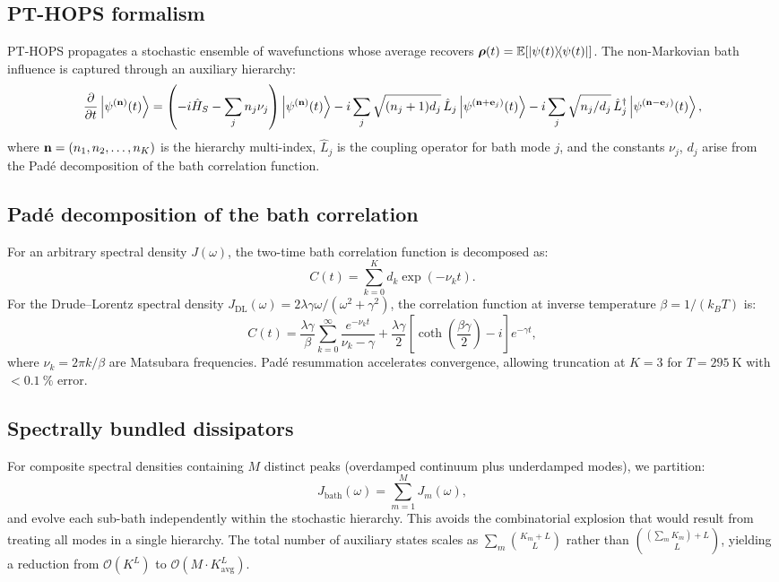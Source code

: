 \documentclass[journal=jctc,manuscript=article]{achemso}
\begin{document}
\subsection{PT-HOPS formalism}
PT-HOPS propagates a stochastic ensemble of wavefunctions whose average recovers $\vb*{\rho}(t) = \mathbb{E}[\dyad{\psi(t)}]$. The non-Markovian bath influence is captured through an auxiliary hierarchy:\cite{Suess2014,Citty2024a}
\begin{equation}
\pdv{t}\ket{\psi^{(\vb{n})}(t)} = \left(-i\hat{H}_S - \sum_{j} n_j \nu_j\right)\ket{\psi^{(\vb{n})}(t)}
- i\sum_{j} \sqrt{(n_j+1)d_j}\, \hat{L}_j \ket{\psi^{(\vb{n}+\vb{e}_j)}(t)}
- i\sum_{j} \sqrt{n_j/d_j}\, \hat{L}_j^\dagger \ket{\psi^{(\vb{n}-\vb{e}_j)}(t)},
\label{eq:hops}
\end{equation}
where $\vb{n} = (n_1, n_2, \ldots, n_K)$ is the hierarchy multi-index, $\hat{L}_j$ is the coupling operator for bath mode $j$, and the constants $\nu_j$, $d_j$ arise from the Padé decomposition of the bath correlation function.\cite{Duan2017}

\subsection{Padé decomposition of the bath correlation}
For an arbitrary spectral density $J(\omega)$, the two-time bath correlation function is decomposed as:
\begin{equation}
C(t) = \sum_{k=0}^{K} d_k \exp(-\nu_k t).
\label{eq:bath_correlation}
\end{equation}
For the Drude--Lorentz spectral density $J_{\mathrm{DL}}(\omega) = 2\lambda\gamma\omega/(\omega^2 + \gamma^2)$, the correlation function at inverse temperature $\beta = 1/(k_B T)$ is:\cite{Tanimura1989}
\begin{equation}
C(t) = \frac{\lambda\gamma}{\beta}\sum_{k=0}^{\infty} \frac{e^{-\nu_k t}}{\nu_k - \gamma} + \frac{\lambda\gamma}{2}\left[\coth\!\left(\frac{\beta\gamma}{2}\right) - i\right]e^{-\gamma t},
\label{eq:correlation_DL}
\end{equation}
where $\nu_k = 2\pi k/\beta$ are Matsubara frequencies. Padé resummation accelerates convergence, allowing truncation at $K = 3$ for $T = \SI{295}{\kelvin}$ with $< \SI{0.1}{\percent}$ error.

\subsection{Spectrally bundled dissipators}
For composite spectral densities containing $M$ distinct peaks (overdamped continuum plus underdamped modes), we partition:\cite{Citty2024a}
\begin{equation}
J_{\mathrm{bath}}(\omega) = \sum_{m=1}^{M} J_m(\omega),
\label{eq:sbd}
\end{equation}
and evolve each sub-bath independently within the stochastic hierarchy. This avoids the combinatorial explosion that would result from treating all modes in a single hierarchy. The total number of auxiliary states scales as $\sum_m \binom{K_m + L}{L}$ rather than $\binom{(\sum_m K_m) + L}{L}$, yielding a reduction from $\mathcal{O}(K^L)$ to $\mathcal{O}(M \cdot K_{\mathrm{avg}}^L)$.
\end{document}
